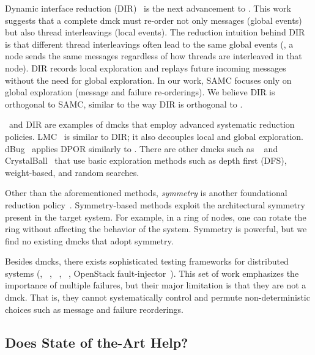 

Dynamic interface reduction (DIR)~\cite{Guo+11-Demeter} is the next
advancement to \modist.  This work suggests that a complete dmck must
re-order not only messages (global events) but also thread
interleavings (local events).  The reduction intuition behind DIR is
that different thread interleavings often lead to the same global
events (\eg, a node sends the same messages regardless of how threads are
interleaved in that node).  DIR records local exploration and replays
future incoming messages without the need for global exploration.  
In our work, SAMC focuses only on global exploration (message and failure
re-orderings).  We believe DIR is orthogonal to SAMC, similar to the
way DIR is orthogonal to \modist.


\modist\ and DIR are examples of dmcks that employ advanced systematic
reduction policies.  LMC~\cite{Guerraoui+11-McNoNetwork} is similar to
DIR; it also decouples local and global exploration.
dBug~\cite{Simsa+10-Dbug} applies DPOR similarly to \modist.  There are
other dmcks such as \macemc~\cite{Killian+07-LifeDeathMaceMC} and
CrystalBall~\cite{Yabandeh+09-CrystalBall} that use basic exploration
methods such as depth first (DFS), weight-based,
and random searches.

Other than the aforementioned methods, {\em symmetry} is another
foundational reduction policy~\cite{Emerson+97-PorAndSym,
  Prasad+00-SymBasedMc}.  Symmetry-based methods exploit the
architectural symmetry present in the target system.  For example, in
a ring of nodes, one can rotate the ring without affecting
the behavior of the system.  Symmetry is powerful, but 
we find no existing dmcks that adopt symmetry.

Besides dmcks, there exists sophisticated testing frameworks for
distributed systems (\eg, \fate~\cite{Gunawi+11-FateDestini},
\prefail~\cite{Joshi+11-PreFail},
\setsudo~\cite{Joshi+13-SetsudoTesting}, OpenStack
fault-injector~\cite{Ju+13-FaultResOpenStack}). This set of work
emphasizes the importance of multiple failures, but their major
limitation is that they are not a dmck.  That is, they cannot
systematically control and permute non-deterministic choices such as
message and failure reorderings.


\subsection{Does State of the-Art Help?}
\label{mot-summ}

